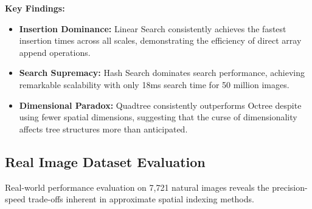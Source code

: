 \documentclass{sbc2023}
\begin{document}
\textbf{Key Findings:}

\begin{itemize}
    \item \textbf{Insertion Dominance:} Linear Search consistently achieves the fastest insertion times across all scales, demonstrating the efficiency of direct array append operations.
    \item \textbf{Search Supremacy:} Hash Search dominates search performance, achieving remarkable scalability with only 18ms search time for 50 million images.
    \item \textbf{Dimensional Paradox:} Quadtree consistently outperforms Octree despite using fewer spatial dimensions, suggesting that the curse of dimensionality affects tree structures more than anticipated.
\end{itemize}

\subsection{Real Image Dataset Evaluation}

Real-world performance evaluation on 7,721 natural images reveals the precision-speed trade-offs inherent in approximate spatial indexing methods.
\end{document}
